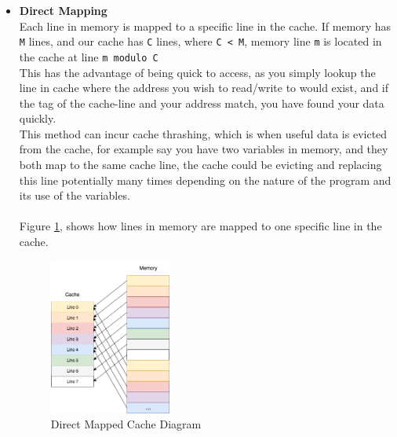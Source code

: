 \documentclass[bsc,frontabs,twoside,singlespacing,parskip,deptreport]{infthesis}     %
\begin{document}
\begin{itemize}
    \item{
        {\bf Direct Mapping} \\
        Each line in memory is mapped to a specific line in the cache. If memory has \texttt{M} lines, and our cache has \texttt{C} lines, where \texttt{C < M}, memory line \texttt{m} is located in the cache at line \texttt{m modulo C}\\
        This has the advantage of being quick to access, as you simply lookup the line in cache where the address you wish to read/write to would exist, and if the tag of the cache-line and your address match, you have found your data quickly. \\
        This method can incur cache thrashing, which is when useful data is evicted from the cache, for example say you have two variables in memory, and they both map to the same cache line, the cache could be evicting and replacing this line potentially many times depending on the nature of the program and its use of the variables. \\
        \\
        Figure \ref{fig:dir-map}, shows how lines in memory are mapped to one specific line in the cache.
    }
    \begin{figure}[h]
        \includegraphics[width=4cm]{direct_mapped.png}
        \centering
        \caption{Direct Mapped Cache Diagram}
        \label{fig:dir-map}
    \end{figure}
    

\end{itemize}
\end{document}
